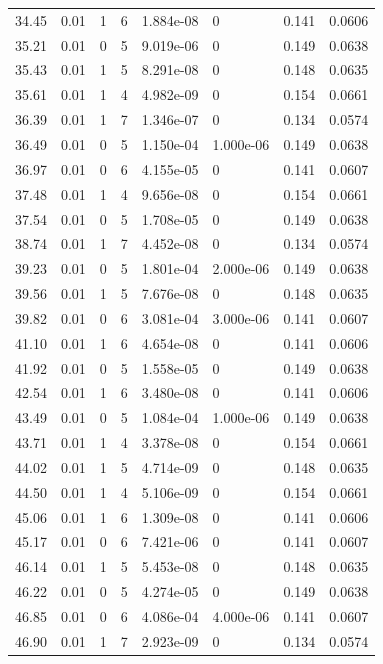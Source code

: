 \documentclass[preview]{standalone}
\begin{document}
{{{\begin{tabular}{L{1.2cm}C{1.2cm} C{0.3cm}C{0.5cm} C{1.4cm}C{1.4cm} C{1.4cm}C{1.4cm}}
  34.45  &  0.01  & 1     &  6 &  1.884e-08  & 0  & 0.141 &  0.0606   \\ 
  35.21  &  0.01  & 0     &  5 &  9.019e-06  & 0  & 0.149 &  0.0638   \\ 
  35.43  &  0.01  & 1     &  5 &  8.291e-08  & 0  & 0.148 &  0.0635   \\ 
  35.61  &  0.01  & 1     &  4 &  4.982e-09  & 0  & 0.154 &  0.0661   \\ 
  36.39  &  0.01  & 1     &  7 &  1.346e-07  & 0  & 0.134 &  0.0574   \\ 
  36.49  &  0.01  & 0     &  5 &  1.150e-04  & 1.000e-06  & 0.149 &  0.0638   \\ 
  36.97  &  0.01  & 0     &  6 &  4.155e-05  & 0  & 0.141 &  0.0607   \\ 
  37.48  &  0.01  & 1     &  4 &  9.656e-08  & 0  & 0.154 &  0.0661   \\ 
  37.54  &  0.01  & 0     &  5 &  1.708e-05  & 0  & 0.149 &  0.0638   \\ 
  38.74  &  0.01  & 1     &  7 &  4.452e-08  & 0  & 0.134 &  0.0574   \\ 
  39.23  &  0.01  & 0     &  5 &  1.801e-04  & 2.000e-06  & 0.149 &  0.0638   \\ 
  39.56  &  0.01  & 1     &  5 &  7.676e-08  & 0  & 0.148 &  0.0635   \\ 
  39.82  &  0.01  & 0     &  6 &  3.081e-04  & 3.000e-06  & 0.141 &  0.0607   \\ 
  41.10  &  0.01  & 1     &  6 &  4.654e-08  & 0  & 0.141 &  0.0606   \\ 
  41.92  &  0.01  & 0     &  5 &  1.558e-05  & 0  & 0.149 &  0.0638   \\ 
  42.54  &  0.01  & 1     &  6 &  3.480e-08  & 0  & 0.141 &  0.0606   \\ 
  43.49  &  0.01  & 0     &  5 &  1.084e-04  & 1.000e-06  & 0.149 &  0.0638   \\ 
  43.71  &  0.01  & 1     &  4 &  3.378e-08  & 0  & 0.154 &  0.0661   \\ 
  44.02  &  0.01  & 1     &  5 &  4.714e-09  & 0  & 0.148 &  0.0635   \\ 
  44.50  &  0.01  & 1     &  4 &  5.106e-09  & 0  & 0.154 &  0.0661   \\ 
  45.06  &  0.01  & 1     &  6 &  1.309e-08  & 0  & 0.141 &  0.0606   \\ 
  45.17  &  0.01  & 0     &  6 &  7.421e-06  & 0  & 0.141 &  0.0607   \\ 
  46.14  &  0.01  & 1     &  5 &  5.453e-08  & 0  & 0.148 &  0.0635   \\ 
  46.22  &  0.01  & 0     &  5 &  4.274e-05  & 0  & 0.149 &  0.0638   \\ 
  46.85  &  0.01  & 0     &  6 &  4.086e-04  & 4.000e-06  & 0.141 &  0.0607   \\ 
  46.90  &  0.01  & 1     &  7 &  2.923e-09  & 0  & 0.134 &  0.0574   \\ 
\hline 
\end{tabular} 

}}}
\end{document}
